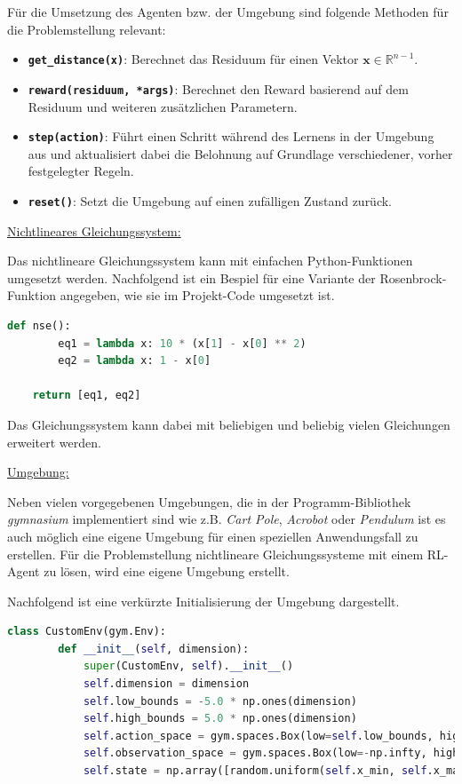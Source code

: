 \documentclass{article}
\def\code#1{\texttt{#1}}
\theoremstyle{newline}
\begin{document}
\begin{onehalfspace}
Für die Umsetzung des Agenten bzw. der Umgebung sind folgende Methoden für die Problemstellung relevant:

\begin{itemize}
	\item \textbf{\code{get\_distance(x)}}: Berechnet das Residuum für einen Vektor $\mathbf{x} \in \mathbb{R}^{n-1}$.
	\item \textbf{\code{reward(residuum, *args)}}: Berechnet den Reward basierend auf dem Residuum und weiteren zusätzlichen Parametern.
	\item \textbf{\code{step(action)}}: Führt einen Schritt während des Lernens in der Umgebung aus und aktualisiert dabei die Belohnung auf Grundlage verschiedener, vorher festgelegter Regeln.
	\item \textbf{\code{reset()}}: Setzt die Umgebung auf einen zufälligen Zustand zurück.
\end{itemize}
\bigskip

\underline{Nichtlineares Gleichungssystem:}
\smallskip

Das nichtlineare Gleichungssystem kann mit einfachen Python-Funktionen umgesetzt werden. Nachfolgend ist ein Bespiel für eine Variante der Rosenbrock-Funktion angegeben, wie sie im Projekt-Code umgesetzt ist.

\begin{lstlisting}[language=Python, caption={Nichtlineares Gleichungssystem in Python}, label={lst:python}]
	def nse():
		eq1 = lambda x: 10 * (x[1] - x[0] ** 2)
		eq2 = lambda x: 1 - x[0]
	
	return [eq1, eq2]
\end{lstlisting}

Das Gleichungssystem kann dabei mit beliebigen und beliebig vielen Gleichungen erweitert werden.
\bigskip

\underline{Umgebung:}
\smallskip

Neben vielen vorgegebenen Umgebungen, die in der Programm-Bibliothek \textit{gymnasium} implementiert sind wie z.B. \textit{Cart Pole}, \textit{Acrobot} oder \textit{Pendulum} ist es auch möglich eine eigene Umgebung für einen speziellen Anwendungsfall zu erstellen. Für die Problemstellung nichtlineare Gleichungssysteme mit einem RL-Agent zu lösen, wird eine eigene Umgebung erstellt. 

Nachfolgend ist eine verkürzte Initialisierung der Umgebung dargestellt.

\begin{lstlisting}[language=Python, caption={Initialisierung der Umgebung}, label={lst:python}]
	class CustomEnv(gym.Env):
		def __init__(self, dimension):
			super(CustomEnv, self).__init__()
			self.dimension = dimension
			self.low_bounds = -5.0 * np.ones(dimension)
			self.high_bounds = 5.0 * np.ones(dimension)
			self.action_space = gym.spaces.Box(low=self.low_bounds, high=self.high_bounds, dtype=np.float64)
			self.observation_space = gym.spaces.Box(low=-np.infty, high=np.infty, shape=(dimension,))
			self.state = np.array([random.uniform(self.x_min, self.x_max), random.uniform(self.y_min, self.y_max)] + [0.0] * dimension)	
\end{lstlisting}


\end{onehalfspace}
\end{document}
